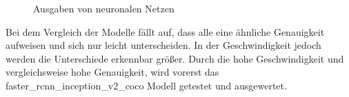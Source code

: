 \documentclass[a4paper,12pt,oneside]{article}
\begin{document}
\begin{figure} 
	[h]
	\centering
    \label{img:Mask} 
    \label{img:Boxes} 
\caption{Ausgaben von neuronalen Netzen} 
\end{figure} 

\newpage

Bei dem Vergleich der Modelle fällt auf, dass alle eine ähnliche Genauigkeit aufweisen und sich nur leicht unterscheiden. In der Geschwindigkeit jedoch werden die Unterschiede erkennbar größer. Durch die hohe Geschwindigkeit und vergleichsweise hohe Genauigkeit, wird vorerst das faster\_rcnn\_inception\_v2\_coco Modell getestet und ausgewertet.
\\
\end{document}
